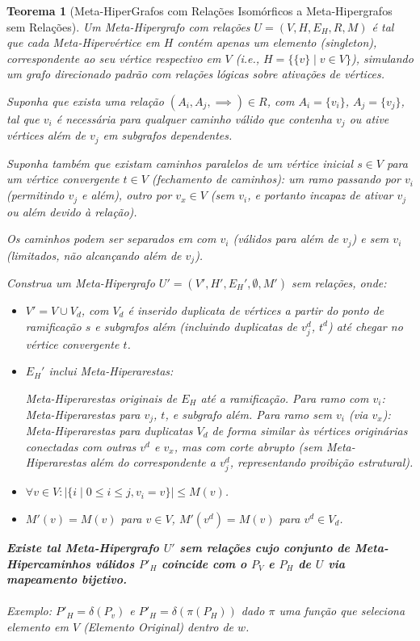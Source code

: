 \documentclass{article}
\newtheorem{theorem}{Teorema}
\begin{document}
\begin{theorem}[Meta-HiperGrafos com Relações Isomórficos a Meta-Hipergrafos sem Relações]
Um Meta-Hipergrafo com relações \( U = (V, H, E_H, R, M) \) é tal que cada Meta-Hipervértice em \( H \) contém apenas um elemento (singleton), correspondente ao seu vértice respectivo em \( V \) (i.e., \( H = \{ \{v\} \mid v \in V \} \)), simulando um grafo direcionado padrão com relações lógicas sobre ativações de vértices.

Suponha que exista uma relação \( (A_i, A_j, \implies) \in R \), com \( A_i = \{v_i\} \), \( A_j = \{v_j\} \), tal que \( v_i \) é necessária para qualquer caminho válido que contenha \( v_j \) ou ative vértices além de \( v_j \) em subgrafos dependentes.

Suponha também que existam caminhos paralelos de um vértice inicial \( s \in V \) para um vértice convergente \( t \in V \) (fechamento de caminhos): um ramo passando por \( v_i \) (permitindo \( v_j \) e além), outro por \( v_x \in V \) (sem \( v_i \), e portanto incapaz de ativar \( v_j \) ou além devido à relação).

Os caminhos podem ser separados em com \( v_i \) (válidos para além de \( v_j \)) e sem \( v_i \) (limitados, não alcançando além de \( v_j \)).

Construa um Meta-Hipergrafo \( U' = (V', H', E_H', \emptyset, M') \) sem relações, onde:

\begin{itemize}
    \item \( V' = V \cup V_d \), com \( V_d \) é inserido duplicata de vértices a partir do ponto de ramificação \( s \) e subgrafos além (incluindo duplicatas de \( v_j^d \), \( t^d \)) até chegar no vértice convergente \( t \).
    \item \( E_H' \) inclui Meta-Hiperarestas:

    \subitem Meta-Hiperarestas originais de \( E_H \) até a ramificação.
    \subitem Para ramo com \( v_i \): Meta-Hiperarestas para \( v_j \), \( t \), e subgrafo além.
    \subitem Para ramo sem \( v_i \) (via \( v_x \)): Meta-Hiperarestas para duplicatas \( V_d \) de forma similar às vértices originárias conectadas com outras \( v^d \) e \( v_x \), mas com corte abrupto (sem Meta-Hiperarestas além do correspondente a \( v_j^d \), representando proibição estrutural).

    \item \( \forall v \in V: |\{ i \mid 0 \leq i \leq j, v_i = v \}| \leq M(v) \).
    \item \( M'(v) = M(v) \) para \( v \in V \), \( M'(v^d) = M(v) \) para \( v^d \in V_d \).
\end{itemize}


\textbf{Existe tal Meta-Hipergrafo \( U' \) sem relações cujo conjunto de Meta-Hipercaminhos válidos \( P'_H \) coincide com o \( P_V \) e \( P_H \) de \( U \) via mapeamento bijetivo.}
\\
\\
Exemplo: \( P'_H = \delta(P_v) \) e \( P'_H = \delta(\pi(P_H)) \) dado \( \pi \) uma função que seleciona elemento em \( V \) (Elemento Original) dentro de \( w \).
\end{theorem}
\end{document}
